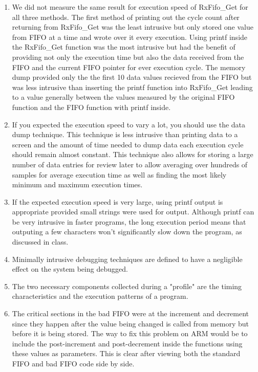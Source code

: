 \documentclass{article}
\begin{document}
\begin{enumerate}
	\item %
		We did not measure the same result for execution speed of RxFifo\_Get for all three methods. The first method of printing out the cycle count after returning from RxFifo\_Get was the least intrusive but only stored one value from FIFO at a time and wrote over it every execution. Using printf inside the RxFifo\_Get function was the most intrusive but had the benefit of providing not only the execution time but also the data received from the FIFO and the current FIFO pointer for ever execution cycle. The memory dump provided only the the first 10 data values recieved from the FIFO but was less intrusive than inserting the printf function into RxFifo\_Get leading to a value generally between the values measured by the original FIFO function and the FIFO function with printf inside.

	\item %
		If you expected the execution speed to vary a lot, you should use the data dump technique. This technique is less intrusive than printing data to a screen and the amount of time needed to dump data each execution cycle should remain almost constant. This technique also allows for storing a large number of data entries for review later to allow averaging over hundreds of samples for average execution time as well as finding the most likely minimum and maximum execution times.

	\item %
		If the expected execution speed is very large, using printf output is appropriate provided small strings were used for output. Although printf can be very intrusive in faster programs, the long execution period means that outputing a few characters won't significantly slow down the program, as discussed in class.

	\item %
		Minimally intrusive debugging techniques are defined to have a negligible effect on the system being debugged.

	\item %
		The two necessary components collected during a "profile" are the timing characteristics and the execution patterns of a program.

	\item %
		The critical sections in the bad FIFO were at the increment and decrement since they happen after the value being changed is called from memory but before it is being stored. The way to fix this problem on ARM would be to include the post-increment and post-decrement inside the functions using these values as parameters. This is clear after viewing both the standard FIFO and bad FIFO code side by side.

\end{enumerate}
\end{document}
